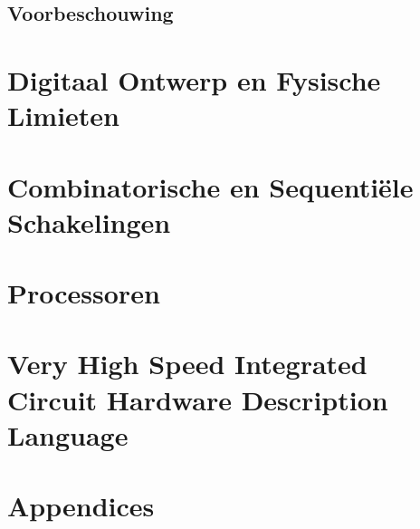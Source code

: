 \documentclass[a4paper,10pt,titlepage]{book}
\begin{document}
\chapter*{Voorbeschouwing}
\mainmatter
\part{Digitaal Ontwerp en Fysische Limieten}


\part{Combinatorische en Sequenti\"ele Schakelingen}


\part{Processoren}


\part{Very High Speed Integrated Circuit Hardware Description Language}

\appendix
\part{Appendices}



\backmatter
\listoftables
\listoffigures
{}
\begin{twocolumn}
\nocite{*}


\label{reference}
\end{twocolumn}
\label{glos}
\printglossaries
\label{idx}
\printindex
\end{document}
